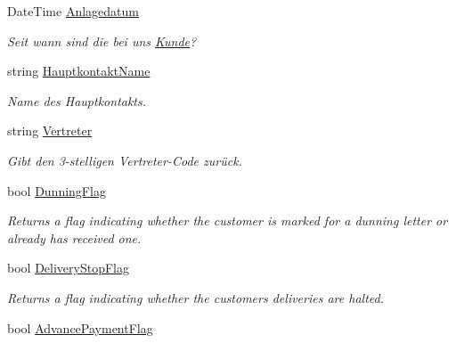 \begin{DoxyCompactItemize}
Date\+Time \hyperlink{class_products_1_1_model_1_1_entities_1_1_kunde_a3fafe273d86608b8bd8f2ca874e6ceca}{Anlagedatum}
\begin{DoxyCompactList}\small\item\em Seit wann sind die bei uns \hyperlink{class_products_1_1_model_1_1_entities_1_1_kunde}{Kunde}? \end{DoxyCompactList}\item 
string \hyperlink{class_products_1_1_model_1_1_entities_1_1_kunde_a7379ca8a4f4b60db352f4bc42ff16a5b}{Hauptkontakt\+Name}
\begin{DoxyCompactList}\small\item\em Name des Hauptkontakts. \end{DoxyCompactList}\item 
string \hyperlink{class_products_1_1_model_1_1_entities_1_1_kunde_a97934cbc4bad187523cd4d94d199f659}{Vertreter}
\begin{DoxyCompactList}\small\item\em Gibt den 3-\/stelligen Vertreter-\/\+Code zurück. \end{DoxyCompactList}\item 
bool \hyperlink{class_products_1_1_model_1_1_entities_1_1_kunde_aa9899cab5b95d9c3849a161343c0ef54}{Dunning\+Flag}
\begin{DoxyCompactList}\small\item\em Returns a flag indicating whether the customer is marked for a dunning letter or already has received one. \end{DoxyCompactList}\item 
bool \hyperlink{class_products_1_1_model_1_1_entities_1_1_kunde_a9d82256754c5ad73ebe3b8e806535538}{Delivery\+Stop\+Flag}
\begin{DoxyCompactList}\small\item\em Returns a flag indicating whether the customer\textquotesingle{}s deliveries are halted. \end{DoxyCompactList}\item 
bool \hyperlink{class_products_1_1_model_1_1_entities_1_1_kunde_ae64bf24ec99cf56db2274a60e9c72571}{Advance\+Payment\+Flag}

\end{DoxyCompactItemize}
